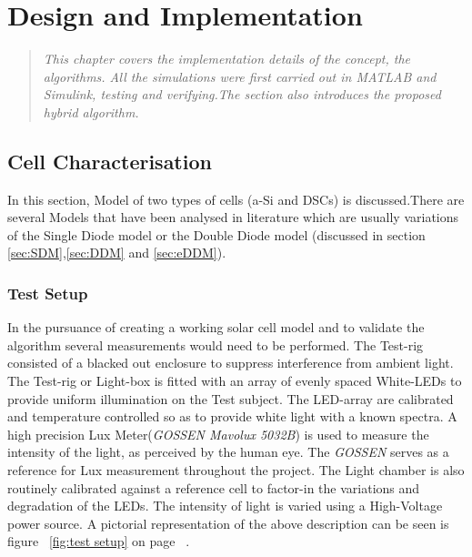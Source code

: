 \chapter{Design and Implementation}
\begin{quote} 
\it This chapter covers the implementation details of the concept, the algorithms. All the simulations were first carried out in MATLAB{\textregistered} and Simulink{\textregistered}, testing and verifying.The section also introduces the proposed hybrid algorithm.
\end{quote}

\section{Cell Characterisation}\label{sec:cel_char}
In this section, Model of two types of cells (\ac{a-Si} and \ac{DSCs}) is discussed.There are several Models that have been analysed in literature which are usually variations of the Single Diode model or the Double Diode model (discussed in section \ref{sec:SDM},\ref{sec:DDM} and \ref{sec:eDDM}).
 
\subsection{Test Setup}

 In the pursuance of creating a working solar cell model and to validate the algorithm several measurements would need to be performed. The Test-rig consisted of a blacked out enclosure to suppress interference from ambient light. The Test-rig or Light-box is fitted with an array of evenly spaced White-\ac{LED}s to provide uniform illumination on the Test subject. The \ac{LED}-array are calibrated and temperature controlled so as to provide white light with a known spectra. A high precision Lux Meter(\textit{GOSSEN Mavolux 5032B}) is used to measure the  intensity of the light, as perceived by the human eye. The \textit{GOSSEN} serves as a reference for Lux measurement throughout the project. The Light chamber is also routinely calibrated against a reference cell to factor-in the variations and degradation of the \ac{LED}s. The intensity of light is varied using a High-Voltage power source. A pictorial representation of the above description can be seen is figure ~\ref{fig:test setup} on page ~\pageref{fig:test setup}. \\



